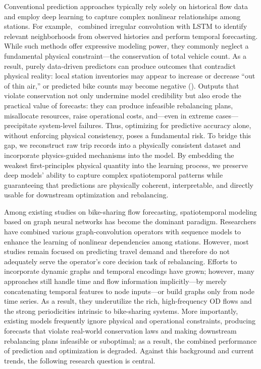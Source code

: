 \documentclass[preprint,12pt,authoryear]{elsarticle}
\begin{document}
Conventional prediction approaches typically rely solely on historical flow data and employ deep learning to capture complex nonlinear relationships among stations. For example,~\cite{li2023improving} combined irregular convolution with LSTM to identify relevant neighborhoods from observed histories and perform temporal forecasting. While such methods offer expressive modeling power, they commonly neglect a fundamental physical constraint—the conservation of total vehicle count. As a result, purely data-driven predictors can produce outcomes that contradict physical reality: local station inventories may appear to increase or decrease “out of thin air,” or predicted bike counts may become negative (\cite{MOHSENI2026104701}). Outputs that violate conservation not only undermine model credibility but also erode the practical value of forecasts: they can produce infeasible rebalancing plans, misallocate resources, raise operational costs, and—even in extreme cases—precipitate system-level failures. Thus, optimizing for predictive accuracy alone, without enforcing physical consistency, poses a fundamental risk. To bridge this gap, we reconstruct raw trip records into a physically consistent dataset and incorporate physics-guided mechanisms into the model. By embedding the weakest first-principles physical quantity into the learning process, we preserve deep models' ability to capture complex spatiotemporal patterns while guaranteeing that predictions are physically coherent, interpretable, and directly usable for downstream optimization and rebalancing.

Among existing studies on bike-sharing flow forecasting, spatiotemporal modeling based on graph neural networks has become the dominant paradigm. Researchers have combined various graph-convolution operators with sequence models to enhance the learning of nonlinear dependencies among stations. However, most studies remain focused on predicting travel demand and therefore do not adequately serve the operator's core decision task of rebalancing. Efforts to incorporate dynamic graphs and temporal encodings have grown; however, many approaches still handle time and flow information implicitly—by merely concatenating temporal features to node inputs—or build graphs only from node time series. As a result, they underutilize the rich, high-frequency OD flows and the strong periodicities intrinsic to bike-sharing systems. More importantly, existing models frequently ignore physical and operational constraints, producing forecasts that violate real-world conservation laws and making downstream rebalancing plans infeasible or suboptimal; as a result, the combined performance of prediction and optimization is degraded. Against this background and current trends, the following research question is central.
\end{document}
